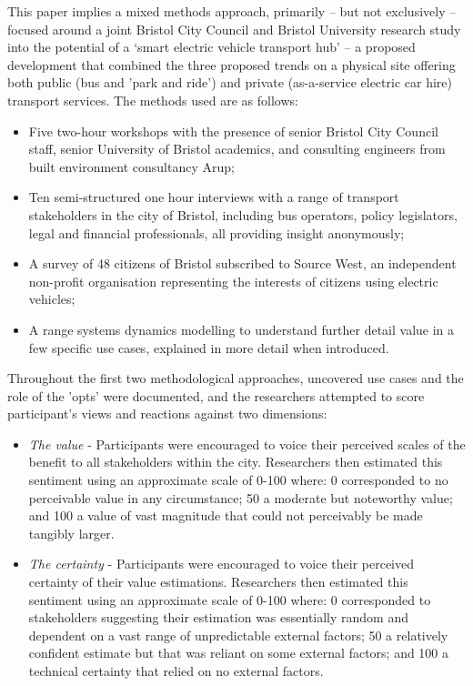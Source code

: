 \documentclass[journal]{IEEEtran}
\begin{document}
This paper implies a mixed methods approach, primarily – but not
exclusively -- focused around a joint Bristol City Council and Bristol
University research study into the potential of a `smart electric
vehicle transport hub' -- a proposed development that combined the three
proposed trends on a physical site offering both public (bus and 'park
and ride') and private (as-a-service electric car hire) transport
services. The methods used are as follows:

\begin{itemize}
\item Five two-hour workshops with the presence of senior Bristol City
Council staff, senior University of Bristol academics, and consulting
engineers from built environment consultancy Arup;
\item Ten semi-structured one hour interviews with a range of
transport stakeholders in the city of Bristol, including bus
operators, policy legislators, legal and financial professionals, all
providing insight anonymously;
\item A survey of 48 citizens of Bristol subscribed to Source West, an
independent non-profit organisation representing the interests of
citizens using electric vehicles;
\item A range systems dynamics modelling to understand further detail
value in a few specific use cases, explained in more detail when
introduced.
\end{itemize}

Throughout the first two methodological approaches, uncovered use cases and the role of the 'opts' were documented, and the researchers attempted to score participant's views and reactions against two dimensions: 

\begin{itemize}
\item  {\emph{The value}} - Participants were encouraged to voice their perceived scales of the benefit to all stakeholders within the city. Researchers then estimated this sentiment using an approximate scale of 0-100 where: 0 corresponded to no perceivable value in any circumstance; 50 a moderate but noteworthy value; and 100 a value of vast magnitude that could not perceivably be made tangibly larger. 	
\item  {\emph{The certainty}} - Participants were encouraged to voice their perceived certainty of their value estimations. Researchers then estimated this sentiment using an approximate scale of 0-100 where: 0 corresponded to stakeholders suggesting their estimation was essentially random and dependent on a vast range of unpredictable external factors; 50 a relatively confident estimate but that was reliant on some external factors; and 100 a technical certainty that relied on no external factors. 
\end{itemize}
\end{document}
